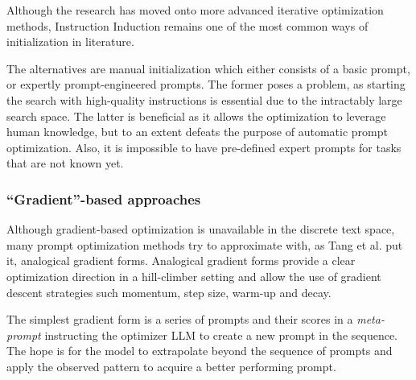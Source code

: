 Although the research has moved onto more advanced iterative optimization methods, Instruction Induction remains one of the 
most common ways of initialization in literature. 

The alternatives are manual initialization which 
either consists of a basic prompt, or expertly prompt-engineered prompts. 
The former poses a problem, as starting the search with high-quality instructions 
is essential due to the intractably large search space\cite{opsahlong2024optimizinginstructionsdemonstrationsmultistage}. 
The latter is beneficial as it allows the optimization to leverage human knowledge\cite{guo2024connectinglargelanguagemodels}, but
to an extent defeats the purpose of automatic prompt optimization. Also, it is impossible to have pre-defined expert prompts for tasks that are not known yet.

\subsubsection{``Gradient''-based approaches}
Although gradient-based optimization is unavailable in the discrete text space, many prompt optimization methods try to approximate with,
as Tang et al.\cite{tang2024unleashingpotentiallargelanguage} put it, analogical gradient forms. Analogical gradient forms provide a clear
optimization direction in a hill-climber setting and allow the use of gradient descent strategies such momentum, step size, warm-up and decay.

The simplest gradient form is a series of prompts and their scores in a \textit{meta-prompt} instructing the optimizer LLM
to create a new prompt in the sequence. The hope is for the model to extrapolate beyond the sequence of prompts
and apply the observed pattern to acquire a better performing prompt. 

